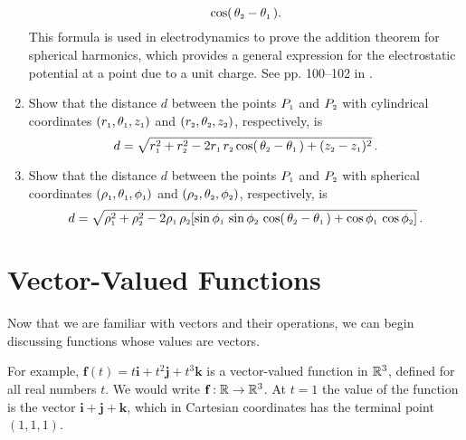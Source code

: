 \begin{enumerate}[\bfseries 1.]
\begin{displaymath}
    \cos ( \, \theta_{\scriptscriptstyle 2} - \theta_{\scriptscriptstyle 1} \, ) .
  \end{displaymath}
This formula is used in electrodynamics to prove the addition theorem for spherical harmonics, which provides a general expression for the electrostatic potential at a point due to a unit charge. 
See pp. 100--102 in \cite{jac}.
 \item Show that the distance $d$ between the points $P_{\scriptscriptstyle 1}$ and $P_{\scriptscriptstyle 2}$ with cylindrical coordinates
  $( r_{\scriptscriptstyle 1},\theta_{\scriptscriptstyle 1},z_{\scriptscriptstyle 1} )$ and $( r_{\scriptscriptstyle 2},\theta_{\scriptscriptstyle 2},z_{\scriptscriptstyle 2} )$, respectively, is
  \begin{displaymath}
   d = \sqrt{r_{\scriptscriptstyle 1}^2 + r_{\scriptscriptstyle 2}^2 - 2 r_{\scriptscriptstyle 1}\,r_{\scriptscriptstyle 2} \cos (\, \theta_{\scriptscriptstyle 2} - \theta_{\scriptscriptstyle 1} \,)
   + ( z_{\scriptscriptstyle 2} - z_{\scriptscriptstyle 1} )^2} \, .
  \end{displaymath}
 \item Show that the distance $d$ between the points $P_{\scriptscriptstyle 1}$ and $P_{\scriptscriptstyle 2}$ with spherical coordinates
  $( \rho_{\scriptscriptstyle 1},\theta_{\scriptscriptstyle 1},\phi_{\scriptscriptstyle 1} )$ and $( \rho_{\scriptscriptstyle 2},\theta_{\scriptscriptstyle 2},\phi_{\scriptscriptstyle 2} )$,
  respectively, is
  \begin{displaymath}
   d = \sqrt{\rho_{\scriptscriptstyle 1}^2 + \rho_{\scriptscriptstyle 2}^2 - 2 \rho_{\scriptscriptstyle 1}\,\rho_{\scriptscriptstyle 2} [ \sin \phi_{\scriptscriptstyle 1} \,
    \sin \phi_{\scriptscriptstyle 2} \,\cos ( \, \theta_{\scriptscriptstyle 2} - \theta_{\scriptscriptstyle 1} \, ) +
    \cos \phi_{\scriptscriptstyle 1} \, \cos \phi_{\scriptscriptstyle 2} ]} \, .
  \end{displaymath}
\end{enumerate}
\newpage
\section{Vector-Valued Functions}
Now that we are familiar with vectors and their operations, we can begin discussing functions whose values are
vectors.


For example, $\textbf{f}(t) = t \textbf{i} + t^2 \textbf{j} + t^3 \textbf{k}$ is a vector-valued function in $\mathbb{R}^{3}$,
defined for all real numbers $t$. We would write $\textbf{f}: \mathbb{R} \rightarrow \mathbb{R}^{3}$. At $t = 1$
the value of the function is the vector $\textbf{i} + \textbf{j} + \textbf{k}$, which in Cartesian coordinates has the
terminal point $(1,1,1)$.


